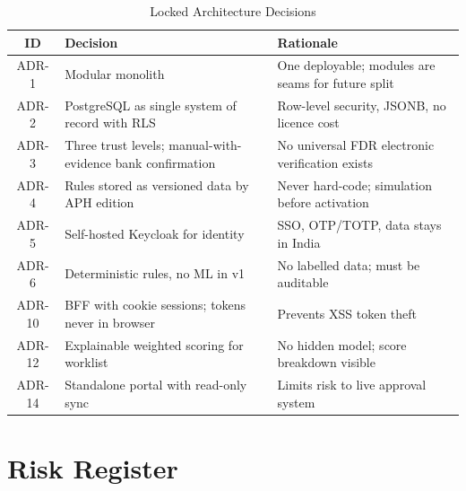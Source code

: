 \documentclass[12pt, a4paper]{report}
\begin{document}
\begin{table}[H]
\centering
\caption{Locked Architecture Decisions}
\begin{tabularx}{\textwidth}{|c|X|X|}
\hline
\textbf{ID} & \textbf{Decision} & \textbf{Rationale} \\
\hline
ADR-1 & Modular monolith & One deployable; modules are seams for future split \\
ADR-2 & PostgreSQL as single system of record with RLS & Row-level security, JSONB, no licence cost \\
ADR-3 & Three trust levels; manual-with-evidence bank confirmation & No universal FDR electronic verification exists \\
ADR-4 & Rules stored as versioned data by APH edition & Never hard-code; simulation before activation \\
ADR-5 & Self-hosted Keycloak for identity & SSO, OTP/TOTP, data stays in India \\
ADR-6 & Deterministic rules, no ML in v1 & No labelled data; must be auditable \\
ADR-10 & BFF with cookie sessions; tokens never in browser & Prevents XSS token theft \\
ADR-12 & Explainable weighted scoring for worklist & No hidden model; score breakdown visible \\
ADR-14 & Standalone portal with read-only sync & Limits risk to live approval system \\
\hline
\end{tabularx}
\end{table}


\chapter{Risk Register}
\end{document}
